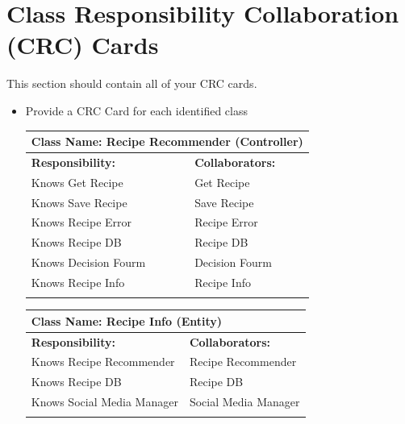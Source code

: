 \documentclass[]{article}
\begin{document}
\clearpage	
\section{Class Responsibility Collaboration (CRC) Cards}
\label{sec:class_responsibility_collaboration_crc_cards}
This section should contain all of your CRC cards.

\begin{itemize}
	\item Provide a CRC Card for each identified class
	\begin{table}[ht]
		\centering
		\begin{tabular}{|p{6cm}|p{6cm}|}
		\hline 
		\multicolumn{2}{|l|}{\textbf{Class Name: Recipe Recommender (Controller)}} \\
		\hline
		\textbf{Responsibility:} & \textbf{Collaborators:} \\
		\hline
		Knows Get Recipe & Get Recipe\\
		Knows Save Recipe & Save Recipe\\
		Knows Recipe Error & Recipe Error\\
		Knows Recipe DB & Recipe DB\\
		Knows Decision Fourm & Decision Fourm\\
		Knows Recipe Info & Recipe Info\\
		\vspace{1in} & \\
		\hline
		\end{tabular}
	\end{table}
	\begin{table}[ht]
		\centering
		\begin{tabular}{|p{6cm}|p{6cm}|}
		\hline 
		\multicolumn{2}{|l|}{\textbf{Class Name: Recipe Info (Entity)}} \\
		\hline
		\textbf{Responsibility:} & \textbf{Collaborators:} \\
		\hline
		Knows Recipe Recommender & Recipe Recommender \\
		Knows Recipe DB & Recipe DB \\
            Knows Social Media Manager & Social Media Manager \\
		\vspace{1in} & \\
		\hline
		\end{tabular}
	\end{table}
	\begin{table}[ht]

\end{table}
\end{itemize}
\end{document}
